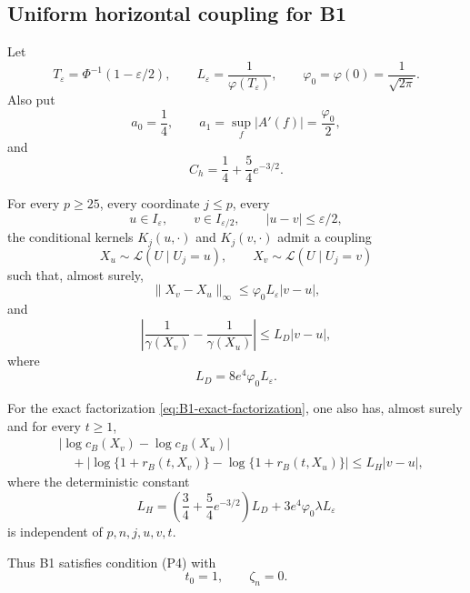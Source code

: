 \subsection{Uniform horizontal coupling for B1}

Let
\[
 T_\varepsilon=\Phi^{-1}(1-\varepsilon/2),
 \qquad
 L_\varepsilon=\frac1{\varphi(T_\varepsilon)},
 \qquad
 \varphi_0=\varphi(0)=\frac1{\sqrt{2\pi}}.
\]
Also put
\[
 a_0=\frac14,
 \qquad
 a_1=\sup_f|A'(f)|
 =\frac{\varphi_0}{2},
\]
and
\begin{equation}
 C_h
 =
 \frac14+\frac54e^{-3/2}.
 \label{eq:B1-Ch}
\end{equation}

\begin{proposition}
\label{prop:B1-horizontal-coupling}
For every \(p\ge25\), every coordinate \(j\le p\),
every
\[
 u\in I_\varepsilon,
 \qquad
 v\in I_{\varepsilon/2},
 \qquad
 |u-v|\le\varepsilon/2,
\]
the conditional kernels \(K_j(u,\cdot)\) and
\(K_j(v,\cdot)\) admit a coupling
\[
 X_u\sim\mathcal L(U\mid U_j=u),
 \qquad
 X_v\sim\mathcal L(U\mid U_j=v)
\]
such that, almost surely,
\begin{equation}
 \|X_v-X_u\|_\infty
 \le
 \varphi_0L_\varepsilon|v-u|,
 \label{eq:B1-U-coupling}
\end{equation}
and
\begin{equation}
 \left|
 \frac1{\gamma(X_v)}-\frac1{\gamma(X_u)}
 \right|
 \le L_D|v-u|,
 \label{eq:B1-LD}
\end{equation}
where
\begin{equation}
 L_D=8e^4\varphi_0L_\varepsilon.
 \label{eq:B1-LD-constant}
\end{equation}

For the exact factorization
\eqref{eq:B1-exact-factorization}, one also has, almost surely
and for every \(t\ge1\),
\begin{align}
 &|\log c_B(X_v)-\log c_B(X_u)|
 \nonumber\\
 &\quad+
 |\log\{1+r_B(t,X_v)\}
   -\log\{1+r_B(t,X_u)\}|
 \le L_H|v-u|,
 \label{eq:B1-LH}
\end{align}
where the deterministic constant
\begin{equation}
 L_H
 =
 \left(
  \frac34+\frac54e^{-3/2}
 \right)L_D
 +3e^4\varphi_0\lambda L_\varepsilon
 \label{eq:B1-LH-constant}
\end{equation}
is independent of \(p,n,j,u,v,t\).

Thus B1 satisfies condition {\rm(P4)} with
\[
 t_0=1,\qquad \zeta_n=0.
\]
\end{proposition}

